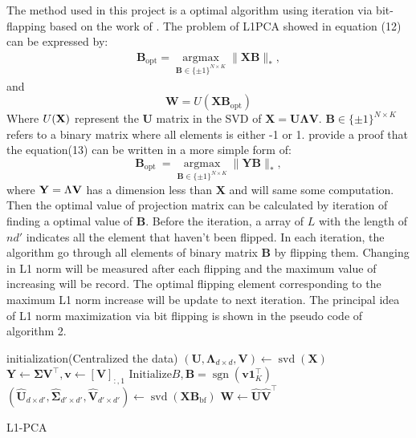 \documentclass{cta-author}
\begin{document}
The method used in this project is a optimal algorithm using iteration via bit-flapping based on the work of \cite{27}.
The problem of L1PCA showed in equation (12) can be expressed by: \cite{28}
\begin{equation}
\begin{aligned}
\mathbf{B}_{\mathrm{opt}}=\underset{\mathbf{B} \in\{ \pm 1\}^{N \times K}}{\operatorname{argmax}}\|\mathbf{X B}\|_*,
\end{aligned}
\end{equation}
and
\begin{equation}
\mathbf{W}=U\left(\mathbf{X B}_{\mathrm{opt}}\right)
\end{equation}
Where $U(\bold X)$ represent the $\boldsymbol{U}$ matrix in the SVD of $\boldsymbol{X} = \boldsymbol{U} \boldsymbol{\Lambda} \boldsymbol{V}$. $\mathbf{B} \in\{ \pm 1\}^{N \times K}$ refers to a binary matrix where all elements is either -1 or 1. \cite{27} provide a proof that the equation(13) can be written in a more simple form of:
\begin{equation}
\mathbf{B}_{\text {opt }}=\underset{\mathbf{B} \in\{ \pm 1\}^{N \times K}}{\operatorname{argmax}}\|\mathbf{Y B}\|_*,
\end{equation}
where $\bold Y = \Lambda \bold V$ has a dimension less than $\boldsymbol{X}$ and will same some computation. Then the optimal value of projection matrix can be calculated by iteration of finding a optimal value of $\boldsymbol{B}$.
Before the iteration, a array of $L$ with the length of $nd'$ indicates all the element that haven't been flipped.
In each iteration, the algorithm go through all elements of binary matrix $\boldsymbol{B}$ by flipping them. Changing in L1 norm will be measured after each flipping and the maximum value of increasing will be record. The optimal flipping element corresponding to the maximum L1 norm increase will be update to next iteration. 
The principal idea of L1 norm maximization via bit flipping is shown in the pseudo code of algorithm 2.
\begin{algorithm}[H]
    initialization(Centralized the data)\;
    $\left(\mathbf{U}, \mathbf{\Lambda}_{d \times d}, \mathbf{V}\right) \leftarrow \operatorname{svd}(\mathbf{X})$\;
    $\mathbf{Y} \leftarrow \mathbf{\Sigma} \mathbf{V}^{\top}, \mathbf{v} \leftarrow[\mathbf{V}]_{:, 1}$\;
    $\text{Initialize} B, \mathbf{B}=\operatorname{sgn}\left(\mathbf{v} \mathbf{1}_K^{\top}\right)$\;
     $\left(\hat{\mathbf{U}}_{d \times d'}, \hat{\boldsymbol{\Sigma}}_{d' \times d'}, \hat{\mathbf{V}}_{d' \times d'}\right) \leftarrow \operatorname{svd}\left(\mathbf{X B}_{\mathrm{bf}}\right)$\;
     $\mathbf{W} \leftarrow \hat{\mathbf{U}} \hat{\mathbf{V}}^{\top}$
 \caption{L1-PCA}
\end{algorithm}
\end{document}

